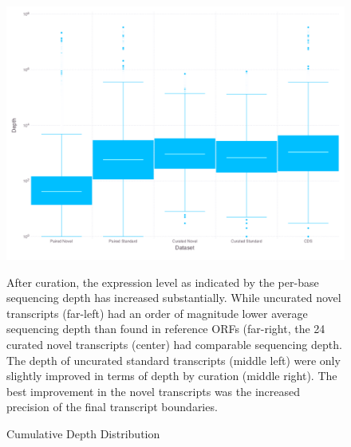 \begin{figure}
\small
\includegraphics[width=\textwidth]{images/Assembly/Curation/CurvsUncur_boxplot.png}
\caption{Cumulative Depth Distribution}\label{fig:5.22}
After curation, the expression level as indicated by the per-base sequencing depth has increased substantially. While uncurated novel transcripts (far-left) had an order of magnitude lower average sequencing depth than found in reference ORFs (far-right, the 24 curated novel transcripts (center) had comparable sequencing depth. The depth of uncurated standard transcripts (middle left) were only slightly improved in terms of depth by curation (middle right). The best improvement in the novel transcripts was the increased precision of the final transcript boundaries.
\end{figure}


